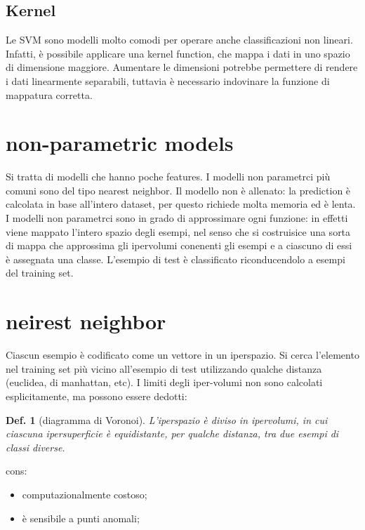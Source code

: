 \documentclass{article}
\newtheorem{definition}{Def.}[section]
\begin{document}
\subsection{Kernel}
Le SVM sono modelli molto comodi per operare anche classificazioni non lineari.
Infatti, è possibile applicare una kernel function, che mappa i dati in uno
spazio di dimensione maggiore. Aumentare le dimensioni potrebbe permettere di
rendere i dati linearmente separabili, tuttavia è necessario indovinare la
funzione di mappatura corretta.

\section{non-parametric models}
Si tratta di modelli che hanno poche features. I modelli non parametrci più
comuni sono del tipo nearest neighbor. Il modello non è allenato: la prediction
è calcolata in base all'intero dataset, per questo richiede molta memoria ed è
lenta. I modelli non parametrci sono in grado di approssimare ogni funzione: in
effetti viene mappato l'intero spazio degli esempi, nel senso che si costruisice
una sorta di mappa che approssima gli ipervolumi conenenti gli esempi e a
ciascuno di essi è assegnata una classe. L'esempio di test è classificato
riconducendolo a esempi del training set. 

\section{neirest neighbor}
Ciascun esempio è codificato come un vettore in un iperspazio. Si cerca
l'elemento nel training set più vicino all'esempio di test utilizzando qualche
distanza (euclidea, di manhattan, etc). I limiti degli iper-volumi non sono
calcolati esplicitamente, ma possono essere dedotti:

\begin{definition}[diagramma di Voronoi]
	L'iperspazio è diviso in ipervolumi, in cui ciascuna ipersuperficie è
	equidistante, per qualche distanza, tra due esempi di classi diverse.
\end{definition}

cons:
\begin{itemize}
	\item computazionalmente costoso;

	\item è sensibile a punti anomali;
\end{itemize}
\end{document}
